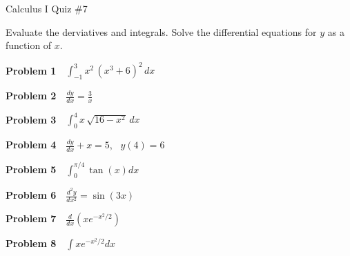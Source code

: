 \documentclass[10pt]{article}
\begin{document}


\begin{center}
Calculus I Quiz \#7
\end{center}


Evaluate the derviatives and integrals. Solve the differential equations for $y$ as a function of $x$.

\vspace{10mm}

\noindent\textbf{Problem 1} \,\, $\int_{-1}^3 x^2 \, (x^3 + 6)^2 \, dx$

\vspace{20mm}

\noindent\textbf{Problem 2} \,\, $\frac{dy}{dx} = \frac{3}{x}$
\vspace{20mm}

\noindent\textbf{Problem 3} \,\, $\int_0^4 x \, \sqrt{16 - x^2} \, dx$
\vspace{20mm}

\noindent\textbf{Problem 4} \,\, $\frac{dy}{dx} + x = 5$, \, $y(4) = 6$
\vspace{20mm}

\noindent\textbf{Problem 5} \,\, $\int_{0}^{\pi/4} \tan(x) dx$
\vspace{20mm}

\noindent\textbf{Problem 6} \,\, $\frac{d^2 y}{dx^2} = \sin(3x)$
\vspace{20mm}

\noindent\textbf{Problem 7} \,\, $\frac{d}{dx}(x e^{-x^2/2})$
\vspace{20mm}

\noindent\textbf{Problem 8} \,\, $\int x e^{-x^2/2} dx$
\end{document}
